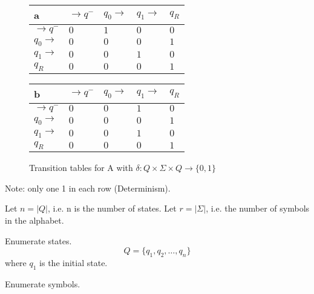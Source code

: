 \documentclass[runningheads,a4paper]{llncs}
\begin{document}
\begin{figure}
\begin{center}

	\setlength{\tabcolsep}{4pt}
	\renewcommand{\arraystretch}{1.4}

	\begin{tabular}{|P{1.0cm} || P{0.8cm} | P{0.8cm} | P{0.8cm} | P{0.8cm}|}
	\hline
	a & $\rightarrow q^-$ & $q_0 \rightarrow$ & $q_1 \rightarrow$ & $q_R$ \\
	\hline
	\hline
	$\rightarrow q^-$ 		& $0$ & $1$ & $0$ & $0$ \\
	\hline
	$q_0 \rightarrow$ 		& $0$ & $0$ & $0$ & $1$ \\
	\hline
	$q_1 \rightarrow$ 		& $0$ & $0$ & $1$ & $0$ \\
	\hline
	$q_R$  					& $0$ & $0$ & $0$ & $1$ \\
	\hline
	
	\end{tabular}
	\hspace*{1 cm}
	\begin{tabular}{|P{1.0cm} || P{0.8cm} | P{0.8cm} | P{0.8cm} | P{0.8cm}|}
	\hline
	b & $\rightarrow q^-$ & $q_0 \rightarrow$ & $q_1 \rightarrow$ & $q_R$ \\
	\hline
	\hline
	$\rightarrow q^-$ 		& $0$ & $0$ & $1$ & $0$ \\
	\hline
	$q_0 \rightarrow$ 		& $0$ & $0$ & $0$ & $1$ \\
	\hline
	$q_1 \rightarrow$ 		& $0$ & $0$ & $1$ & $0$ \\
	\hline
	$q_R$  					& $0$ & $0$ & $0$ & $1$ \\
	\hline
	
	\end{tabular}
	
\caption{Transition tables for A with $\delta: Q \times \Sigma \times Q \rightarrow \{0,1\}$}

\label{fig:ttable_bin}
\end{center}
\end{figure}

Note: only one 1 in each row (Determinism).

Let $n = |Q|$, i.e. n is the number of states.
Let $r = |\Sigma|$, i.e. the number of symbols in the alphabet.

Enumerate states.
\begin{equation}
	Q = \{q_1, q_2, \ldots, q_n\}
\end{equation}
where $q_1$ is the initial state.

Enumerate symbols.
\end{document}

